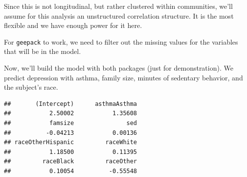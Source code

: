 \documentclass[]{tufte-book}
\newenvironment{Shaded}{}{}
\newcommand{\KeywordTok}[1]{\textcolor[rgb]{0.00,0.44,0.13}{\textbf{#1}}}
\newcommand{\DataTypeTok}[1]{\textcolor[rgb]{0.56,0.13,0.00}{#1}}
\newcommand{\StringTok}[1]{\textcolor[rgb]{0.25,0.44,0.63}{#1}}
\newcommand{\OperatorTok}[1]{\textcolor[rgb]{0.40,0.40,0.40}{#1}}
\newcommand{\NormalTok}[1]{#1}
\theoremstyle{definition}
\theoremstyle{definition}
\theoremstyle{remark}
\begin{document}
Since this is not longitudinal, but rather clustered within communities,
we'll assume for this analysis an unstructured correlation structure. It
is the most flexible and we have enough power for it here.

For \texttt{geepack} to work, we need to filter out the missing values
for the variables that will be in the model.

\begin{Shaded}
\end{Shaded}

Now, we'll build the model with both packages (just for demonstration).
We predict depression with asthma, family size, minutes of sedentary
behavior, and the subject's race.

\begin{Shaded}
\end{Shaded}

\begin{verbatim}
##       (Intercept)      asthmaAsthma 
##           2.50002           1.35608 
##           famsize               sed 
##          -0.04213           0.00136 
## raceOtherHispanic         raceWhite 
##           1.18500           0.11395 
##         raceBlack         raceOther 
##           0.10054          -0.55548
\end{verbatim}

\begin{Shaded}
\end{Shaded}
\end{document}
